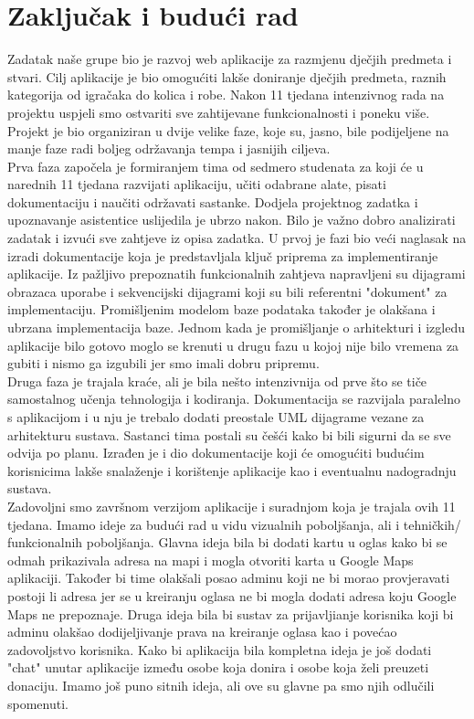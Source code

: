 \chapter{Zaključak i budući rad}
		

		Zadatak naše grupe bio je razvoj web aplikacije za razmjenu dječjih predmeta i stvari. Cilj aplikacije je bio omogućiti lakše doniranje dječjih predmeta, raznih kategorija od igračaka do kolica i robe. Nakon 11 tjedana intenzivnog rada na projektu uspjeli smo ostvariti sve zahtijevane funkcionalnosti i poneku više. Projekt je bio organiziran u dvije velike faze, koje su, jasno, bile podijeljene na manje faze radi boljeg održavanja tempa i jasnijih ciljeva. \\
Prva faza započela je formiranjem tima od sedmero studenata za koji će u narednih 11 tjedana razvijati aplikaciju, učiti odabrane alate, pisati dokumentaciju i naučiti održavati sastanke. Dodjela projektnog zadatka i upoznavanje asistentice uslijedila je ubrzo nakon. Bilo je važno dobro analizirati zadatak i izvući sve zahtjeve iz opisa zadatka. U prvoj je fazi bio veći naglasak na izradi dokumentacije koja je predstavljala ključ priprema za implementiranje aplikacije. Iz pažljivo prepoznatih funkcionalnih zahtjeva napravljeni su dijagrami obrazaca uporabe i sekvencijski dijagrami koji su bili referentni "dokument" za implementaciju. Promišljenim modelom baze podataka također je olakšana i ubrzana implementacija baze. Jednom kada je promišljanje o arhitekturi i izgledu aplikacije bilo gotovo moglo se krenuti u drugu fazu u kojoj nije bilo vremena za gubiti i nismo ga izgubili jer smo imali dobru pripremu. \\
Druga faza je trajala kraće, ali je bila nešto intenzivnija od prve što se tiče samostalnog učenja tehnologija i kodiranja. Dokumentacija se razvijala paralelno s aplikacijom i u nju je trebalo dodati preostale UML dijagrame vezane za arhitekturu sustava. Sastanci tima postali su češći kako bi bili sigurni da se sve odvija po planu. Izrađen je i dio dokumentacije koji će omogućiti budućim korisnicima lakše snalaženje i korištenje aplikacije kao i eventualnu nadogradnju sustava. \\
Zadovoljni smo završnom verzijom aplikacije i suradnjom koja je trajala ovih 11 tjedana. Imamo ideje za budući rad u vidu vizualnih poboljšanja, ali i tehničkih/ funkcionalnih poboljšanja. Glavna ideja bila bi dodati kartu u oglas kako bi se odmah prikazivala adresa na mapi i mogla otvoriti karta u Google Maps aplikaciji. Također bi time olakšali posao adminu koji ne bi morao provjeravati postoji li adresa jer se u kreiranju oglasa ne bi mogla dodati adresa koju Google Maps ne prepoznaje. Druga ideja bila bi sustav za prijavljianje korisnika koji bi adminu olakšao dodijeljivanje prava na kreiranje oglasa kao i povećao zadovoljstvo korisnika. Kako bi aplikacija bila kompletna ideja je još dodati "chat" unutar aplikacije između osobe koja donira i osobe koja želi preuzeti donaciju. Imamo još puno sitnih ideja, ali ove su glavne pa smo njih odlučili spomenuti.  \\

